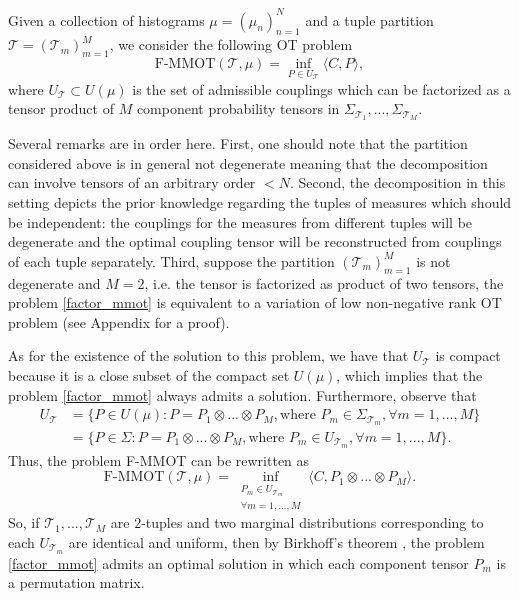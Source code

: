 \begin{definition}
  Given a collection of histograms $\mu = (\mu_n)_{n=1}^N$ and a tuple partition $\mathcal T = (\mathcal T_m)_{m=1}^M$,
  we consider the following OT problem
  \begin{equation} \label{factor_mmot}
    \text{F-MMOT}( \mathcal T, \mu) = \inf_{P \in U_{\mathcal T}} \langle C, P \rangle,
  \end{equation}
  where $U_{\mathcal T} \subset U(\mu)$ is the set of admissible couplings which can be factorized as a tensor product of $M$
  component probability tensors in $\Sigma_{\mathcal T_1}, ..., \Sigma_{\mathcal T_M}$.
\end{definition}
Several remarks are in order here. First, one should note that the partition considered above is in general not degenerate meaning
that the decomposition can involve tensors of an arbitrary order $<N$. Second, the decomposition in this setting depicts the prior
knowledge regarding the tuples of measures which should be independent: the couplings for the measures from different tuples will
be degenerate and the optimal coupling tensor will be reconstructed from couplings of each tuple separately.
Third, suppose the partition $(\mathcal T_m)_{m=1}^M$ is not degenerate and $M=2$, i.e. the tensor is factorized as product of
two tensors, the problem \cref{factor_mmot} is equivalent to a variation of low non-negative rank OT problem (see Appendix for a proof).

As for the existence of the solution to this problem, we have that $U_{\mathcal T}$ is compact because it is a close subset of the
compact set $U(\mu)$, which implies that the problem \cref{factor_mmot} always admits a solution. Furthermore, observe that
\begin{equation}
  \begin{split}
    U_{\mathcal T} &= \{ P \in U(\mu): P = P_1 \otimes ... \otimes P_M, \text{where } P_m \in \Sigma_{\mathcal T_m}, \forall m = 1,...,M \} \\
    &= \{ P \in \Sigma: P = P_1 \otimes ... \otimes P_M, \text{where } P_m \in U_{\mathcal T_m}, \forall m = 1,...,M \}.
  \end{split}
\end{equation}
Thus, the problem F-MMOT can be rewritten as
\begin{equation}
  \text{F-MMOT}( \mathcal T, \mu) = \inf_{\substack{P_m \in U_{\mathcal T_m} \\ \forall m = 1,...,M}}
  \langle C, P_1 \otimes ... \otimes P_M \rangle.
\end{equation}
So, if $\mathcal T_1,...,\mathcal T_M$ are $2$-tuples and two marginal distributions corresponding to each $U_{\mathcal T_m}$ are
identical and uniform, then by Birkhoff's theorem \citep{Birkhoff46}, the problem \ref{factor_mmot} admits an optimal solution in
which each component tensor $P_m$ is a permutation matrix.

